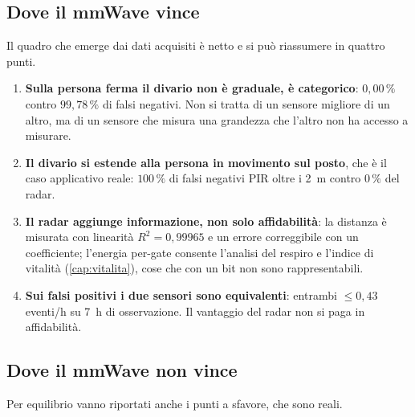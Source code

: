 \subsection{Dove il mmWave vince}

Il quadro che emerge dai dati acquisiti è netto e si può riassumere in quattro
punti.

\begin{enumerate}[leftmargin=1.8em,itemsep=3pt]
  \item \textbf{Sulla persona ferma il divario non è graduale, è categorico}:
        $0{,}00\,\%$ contro $99{,}78\,\%$ di falsi negativi. Non si tratta di un
        sensore migliore di un altro, ma di un sensore che misura una grandezza che
        l'altro non ha accesso a misurare.
  \item \textbf{Il divario si estende alla persona in movimento sul posto}, che è il
        caso applicativo reale: $100\,\%$ di falsi negativi PIR oltre i 2~m contro
        $0\,\%$ del radar.
  \item \textbf{Il radar aggiunge informazione, non solo affidabilità}: la distanza
        è misurata con linearità $R^2 = 0{,}99965$ e un errore correggibile con un
        coefficiente; l'energia per-gate consente l'analisi del respiro e l'indice
        di vitalità (\cref{cap:vitalita}), cose che con un bit non sono
        rappresentabili.
  \item \textbf{Sui falsi positivi i due sensori sono equivalenti}: entrambi
        $\leq 0{,}43$ eventi/h su 7~h di osservazione. Il vantaggio del radar non si
        paga in affidabilità.
\end{enumerate}

\subsection{Dove il mmWave non vince}

Per equilibrio vanno riportati anche i punti a sfavore, che sono reali.

